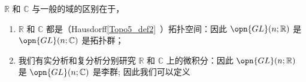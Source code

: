 $\mathbb{R}$ 和 $\mathbb{C}$ 与一般的域的区别在于，
\begin{enumerate}
\item $\mathbb{R}$ 和 $\mathbb{C}$ 都是（Hausdorff\autoref{Topo5_def2}~）拓扑空间：因此 $\opn{GL}(n; \mathbb{R})$ 是 $\opn{GL}(n; \mathbb{C})$ 是拓扑群；
\item 我们有实分析和复分析分别研究 $\mathbb{R}$ 和 $\mathbb{C}$ 上的微积分：因此 $\opn{GL}(n; \mathbb{R})$ 是 $\opn{GL}(n; \mathbb{C})$ 是李群;
因此我们可以定义

\end{enumerate}


